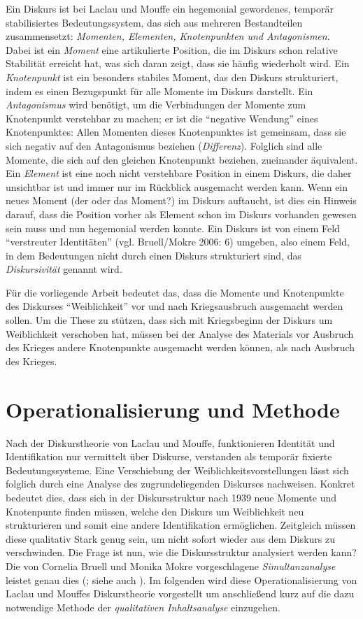 \documentclass[12pt, titlepage=true, toc=bib]{scrartcl}
\begin{document}
Ein Diskurs ist bei Laclau und Mouffe ein hegemonial gewordenes, temporär stabilisiertes Bedeutungssystem, das sich aus mehreren Bestandteilen zusammensetzt: \textit{Momenten, Elementen, Knotenpunkten \textit{und }Antagonismen}. Dabei ist ein \textit{Moment} eine artikulierte Position, die im Diskurs schon relative Stabilität erreicht hat, was sich daran zeigt, dass sie häufig wiederholt wird. Ein \textit{Knotenpunkt} ist ein besonders stabiles Moment, das den Diskurs strukturiert, indem es einen Bezugspunkt für alle Momente im Diskurs darstellt. Ein \textit{Antagonismus} wird benötigt, um die Verbindungen der Momente zum Knotenpunkt verstehbar zu machen; er ist die "`negative Wendung"' eines Knotenpunktes: Allen Momenten dieses Knotenpunktes ist gemeinsam, dass sie sich negativ auf den Antagonismus beziehen (\textit{Differenz}). Folglich sind alle Momente, die sich auf den gleichen Knotenpunkt beziehen, zueinander äquivalent. Ein \textit{Element} ist eine noch nicht verstehbare Position in einem Diskurs, die daher unsichtbar ist und immer nur im Rückblick ausgemacht werden kann. Wenn ein neues Moment (der oder das Moment?) im Diskurs auftaucht, ist dies ein Hinweis darauf, dass die Position vorher als Element schon im Diskurs vorhanden gewesen sein muss und nun hegemonial werden konnte. Ein Diskurs ist von einem Feld "`verstreuter Identitäten"' (vgl. Bruell/Mokre 2006: 6) umgeben, also einem Feld, in dem Bedeutungen nicht durch einen Diskurs strukturiert sind, das \textit{Diskursivität} genannt wird. 

Für die vorliegende Arbeit bedeutet das, dass die Momente und Knotenpunkte des Diskurses "`Weiblichkeit"' vor und nach Kriegsausbruch ausgemacht werden sollen. Um die These zu stützen, dass sich mit Kriegsbeginn der Diskurs um Weiblichkeit verschoben hat, müssen bei der Analyse des Materials vor Ausbruch des Krieges andere Knotenpunkte ausgemacht werden können, als nach Ausbruch des Krieges. 



\section{Operationalisierung und Methode}

Nach der Diskurstheorie von Laclau und Mouffe, funktionieren Identität und Identifikation nur vermittelt über Diskurse, verstanden als temporär fixierte Bedeutungssysteme. Eine Verschiebung der Weiblichkeitsvorstellungen lässt sich folglich durch eine Analyse des zugrundeliegenden Diskurses nachweisen. Konkret bedeutet dies, dass sich in der Diskursstruktur nach 1939 neue Momente und Knotenpunte finden müssen, welche den Diskurs um Weiblichkeit neu strukturieren und somit eine andere Identifikation ermöglichen. Zeitgleich müssen diese qualitativ Stark genug sein, um nicht sofort wieder aus dem Diskurs zu verschwinden. Die Frage ist nun, wie die Diskursstruktur analysiert werden kann? Die von Cornelia Bruell und Monika Mokre vorgeschlagene \textit{Simultanzanalyse} leistet genau dies (\cite*{bruell_chancen_2006}; siehe auch \cite{nonhoff_kollektive_2007}). Im folgenden wird diese Operationalisierung von Laclau und Mouffes Diskurstheorie vorgestellt um anschließend kurz auf die dazu notwendige Methode der \textit{qualitativen Inhaltsanalyse} einzugehen.
\end{document}
